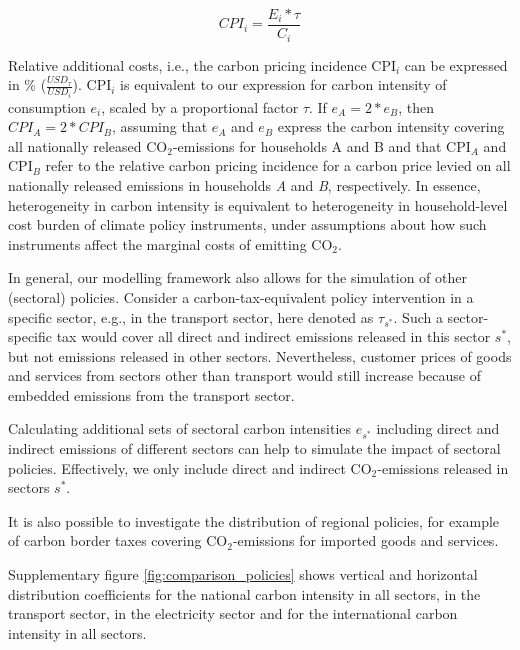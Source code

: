 \documentclass[12pt, a4paper]{article}
\begin{document}
\begin{refsection}
\begin{equation}
    CPI_{i} = \frac{E_{i}*\tau}{C_{i}}
\end{equation}

Relative additional costs, i.e., the carbon pricing incidence CPI$_{i}$ can be expressed in \% ($\frac{USD_{\tau}}{USD_{i}}$). CPI$_{i}$ is equivalent to our expression for carbon intensity of consumption $e_{i}$, scaled by a proportional factor $\tau$. If $e_{A}=2*e_{B}$, then $CPI_{A}=2*CPI_{B}$, assuming that $e_{A}$ and $e_{B}$ express the carbon intensity covering all nationally released CO$_{2}$-emissions for households A and B and that CPI$_{A}$ and CPI$_{B}$ refer to the relative carbon pricing incidence for a carbon price levied on all nationally released emissions in households \textit{A} and \textit{B}, respectively. In essence, heterogeneity in carbon intensity is equivalent to heterogeneity in household-level cost burden of climate policy instruments, under assumptions about how such instruments affect the marginal costs of emitting CO$_{2}$.

In general, our modelling framework also allows for the simulation of other (sectoral) policies. Consider a carbon-tax-equivalent policy intervention in a specific sector, e.g., in the transport sector, here denoted as $\tau_{s^{*}}$. Such a sector-specific tax would cover all direct and indirect emissions released in this sector $s^{*}$, but not emissions released in other sectors. Nevertheless, customer prices of goods and services from sectors other than transport would still increase because of embedded emissions from the transport sector.

Calculating additional sets of sectoral carbon intensities $e_{s^{*}}$ including direct and indirect emissions of different sectors can help to simulate the impact of sectoral policies. Effectively, we only include direct and indirect CO$_{2}$-emissions released in sectors $s^{*}$.

It is also possible to investigate the distribution of regional policies, for example of carbon border taxes covering CO$_{2}$-emissions for imported goods and services. 

Supplementary figure \ref{fig:comparison_policies} shows vertical and horizontal distribution coefficients for the national carbon intensity in all sectors, in the transport sector, in the electricity sector and for the international carbon intensity in all sectors. 

\clearpage

\renewcommand\thefigure{\thesection.\arabic{figure}}
\renewcommand\thetable{\thesection.\arabic{table}}
\setcounter{figure}{0}
\setcounter{table}{0}


\end{refsection}
\end{document}
